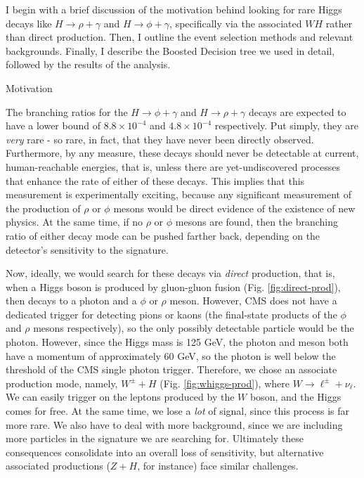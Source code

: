 %
%

I begin with a brief discussion of the motivation behind looking for rare Higgs decays like $H \rightarrow \rho+\gamma$ and $H \rightarrow \phi+\gamma$, specifically via the associated $WH$ rather than direct production. Then, I outline the event selection methods and relevant backgrounds. Finally, I describe the Boosted Decision tree we used in detail, followed by the results of the analysis.

\begin{section}{Motivation}

The branching ratios for the $H \rightarrow \phi+\gamma$ and $H \rightarrow \rho+\gamma$ decays are expected to have a lower bound of $8.8 \times 10^{-4}$ and $4.8 \times 10^{-4}$  respectively\cite{cite-rpg-brs}. Put simply, they are \textit{very} rare - so rare, in fact, that they have never been directly observed. Furthermore, by any measure, these decays should never be detectable at current, human-reachable energies, that is, unless there are yet-undiscovered processes that enhance the rate of either of these decays. This implies that this measurement is experimentally exciting, because any significant measurement of the production of $\rho$ or $\phi$ mesons would be direct evidence of the existence of new physics. At the same time, if no $\rho$ or $\phi$ mesons are found, then the branching ratio of either decay mode can be pushed farther back, depending on the detector's sensitivity to the signature.

Now, ideally, we would search for these decays via \textit{direct} production, that is, when a Higgs boson is produced by gluon-gluon fusion (Fig. \ref{fig:direct-prod}), then decays to a photon and a $\phi$ or $\rho$ meson. However, CMS does not have a dedicated trigger for detecting pions or kaons (the final-state products of the $\phi$ and $\rho$ mesons respectively), so the only possibly detectable particle would be the photon. However, since the Higgs mass is 125 GeV, the photon and meson both have a momentum of approximately 60 GeV, so the photon is well below the threshold of the CMS single photon trigger\cite{cite-hlt}. Therefore, we chose an associate production mode, namely, $W^{\pm}+H$ (Fig. \ref{fig:whiggs-prod}), where $W \rightarrow \ell^{\pm}+\nu_{\ell}$. We can easily trigger on the leptons produced by the $W$ boson, and the Higgs comes for free. At the same time, we lose a \textit{lot} of signal, since this process is far more rare. We also have to deal with more background, since we are including more particles in the signature we are searching for. Ultimately these consequences consolidate into an overall loss of sensitivity, but alternative associated productions ($Z+H$, for instance) face similar challenges.


\end{section}

